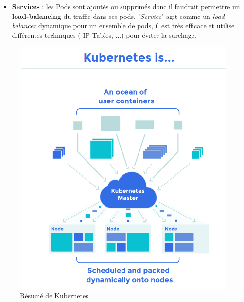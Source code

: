 \begin{onehalfspace}
\begin{itemize}
\item \textbf{Services} : les Pods sont ajoutés ou supprimés donc il faudrait permettre un \textbf{load-balancing} du traffic dans ses pods. "\emph{Service}" agit comme un \emph{load-balancer} dynamique pour un ensemble de pods, il est très efficace et utilise différentes techniques ( IP Tables, ...) pour éviter la surchage.

\end{itemize}
\begin{figure}[H]
\centering
\includegraphics [scale=0.5]{chapitre3/assets/kuber.png}
\caption{Résumé de Kubernetes}
\end{figure}


\end{onehalfspace}

